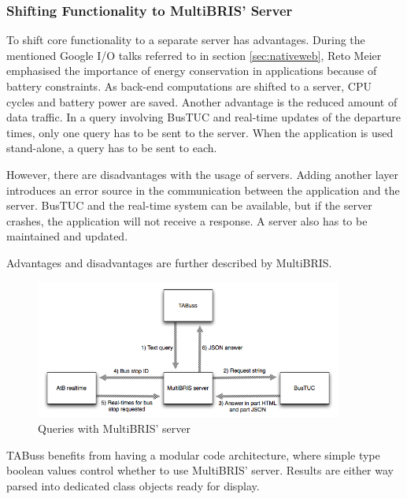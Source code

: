 \subsubsection{Shifting Functionality to MultiBRIS' Server}
To shift core functionality to a separate server has advantages. During the mentioned Google I/O talks referred to in section \ref{sec:nativeweb}, Reto Meier emphasised the importance of energy conservation in applications because of battery constraints. As back-end computations are shifted to a server, CPU cycles and battery power are saved. Another advantage is the reduced amount of data traffic. In a query involving BusTUC and real-time updates of the departure times, only one query has to be sent to the server. When the application is used stand-alone, a query has to be sent to each.

However, there are disadvantages with the usage of servers. Adding another layer introduces an error source in the communication between the application and the server. BusTUC and the real-time system can be available, but if the server crashes, the application will not receive a response. A server also has to be maintained and updated. 

Advantages and disadvantages are further described by MultiBRIS\cite{multibris}.


\begin{figure}
\begin{center}
\includegraphics[width = 0.9\textwidth]{Method/Figures/server.png}
\caption{Queries with MultiBRIS' server}
\label{fig:server}
\end{center}
\end{figure}

TABuss benefits from having a modular code architecture, where simple type boolean values control whether to use MultiBRIS' server. Results are either way parsed into dedicated class objects ready for display. 
\newpage

